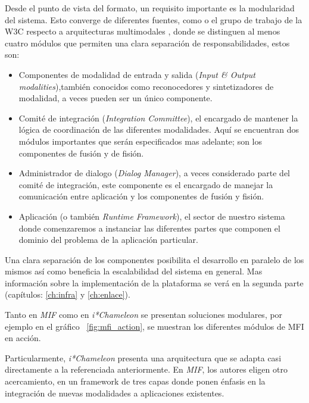 Desde el punto de vista del formato, un requisito importante es la modularidad del sistema. Esto converge de diferentes fuentes, como \citet{dumas2009multimodal} o el grupo de trabajo de la W3C respecto a arquitecturas multimodales \citep{w3c:mmiarch}, donde se distinguen al menos cuatro módulos que permiten una clara separación de responsabilidades, estos son: 
\begin{itemize}
\item
Componentes de modalidad de entrada y salida (\emph{Input \& Output modalities}),también conocidos como reconocedores y sintetizadores de modalidad, a veces pueden ser un único componente.
\item
Comité de integración (\emph{Integration Committee}), el encargado de mantener la lógica de coordinación de las diferentes modalidades. Aquí se encuentran dos módulos importantes que serán especificados mas adelante; son los componentes de fusión y de fisión.
\item
Administrador de dialogo (\emph{Dialog Manager}), a veces considerado parte del comité de integración, este componente es el encargado de manejar la comunicación entre aplicación y los componentes de fusión y fisión.
\item
Aplicación (o también \emph{Runtime Framework}), el sector de nuestro sistema donde comenzaremos a instanciar las diferentes partes que componen el dominio del problema de la aplicación particular. 
\end{itemize}
Una clara separación de los componentes posibilita el desarrollo en paralelo de los mismos así como beneficia la escalabilidad del sistema en general. Mas información sobre la implementación de la plataforma se verá en la segunda parte (capítulos: \ref{ch:infra} y \ref{ch:enlace}).

Tanto en \emph{MIF}\citep{lo2010introduction} como en \emph{i*Chameleon}\citep{lo2013chameleon} se presentan soluciones modulares, por ejemplo en el gráfico ~\ref{fig:mfi_action}, se muestran los diferentes módulos de MFI en acción. 

Particularmente, \emph{i*Chameleon} presenta una arquitectura que se adapta casi directamente a la referenciada anteriormente. En \emph{MIF}, los autores eligen otro acercamiento, en un framework de tres capas donde ponen énfasis en la integración de nuevas modalidades a aplicaciones existentes. 

